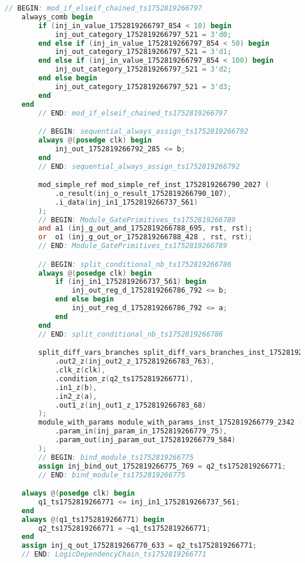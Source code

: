 \begin{lstlisting}[language=Verilog]
        // BEGIN: mod_if_elseif_chained_ts1752819266797
    always_comb begin
        if (inj_in_value_1752819266797_854 < 10) begin
            inj_out_category_1752819266797_521 = 3'd0;
        end else if (inj_in_value_1752819266797_854 < 50) begin
            inj_out_category_1752819266797_521 = 3'd1;
        end else if (inj_in_value_1752819266797_854 < 100) begin
            inj_out_category_1752819266797_521 = 3'd2;
        end else begin
            inj_out_category_1752819266797_521 = 3'd3;
        end
    end
        // END: mod_if_elseif_chained_ts1752819266797

        // BEGIN: sequential_always_assign_ts1752819266792
        always @(posedge clk) begin
            inj_out_1752819266792_285 <= b;
        end
        // END: sequential_always_assign_ts1752819266792

        mod_simple_ref mod_simple_ref_inst_1752819266790_2027 (
            .o_result(inj_o_result_1752819266790_107),
            .i_data(inj_in1_1752819266737_561)
        );
        // BEGIN: Module_GatePrimitives_ts1752819266789
        and a1 (inj_g_out_and_1752819266788_695, rst, rst);
        or  o1 (inj_g_out_or_1752819266788_428 , rst, rst);
        // END: Module_GatePrimitives_ts1752819266789

        // BEGIN: split_conditional_nb_ts1752819266786
        always @(posedge clk) begin
            if (inj_in1_1752819266737_561) begin
                inj_out_reg_d_1752819266786_792 <= b;
            end else begin
                inj_out_reg_d_1752819266786_792 <= a;
            end
        end
        // END: split_conditional_nb_ts1752819266786

        split_diff_vars_branches split_diff_vars_branches_inst_1752819266783_2733 (
            .out2_z(inj_out2_z_1752819266783_763),
            .clk_z(clk),
            .condition_z(q2_ts1752819266771),
            .in1_z(b),
            .in2_z(a),
            .out1_z(inj_out1_z_1752819266783_68)
        );
        module_with_params module_with_params_inst_1752819266779_2342 (
            .param_in(inj_param_in_1752819266779_75),
            .param_out(inj_param_out_1752819266779_584)
        );
        // BEGIN: bind_module_ts1752819266775
        assign inj_bind_out_1752819266775_769 = q2_ts1752819266771;
        // END: bind_module_ts1752819266775

    always @(posedge clk) begin
        q1_ts1752819266771 <= inj_in1_1752819266737_561;
    end
    always @(q1_ts1752819266771) begin
        q2_ts1752819266771 = ~q1_ts1752819266771;
    end
    assign inj_q_out_1752819266770_633 = q2_ts1752819266771;
    // END: LogicDependencyChain_ts1752819266771


\end{lstlisting}
